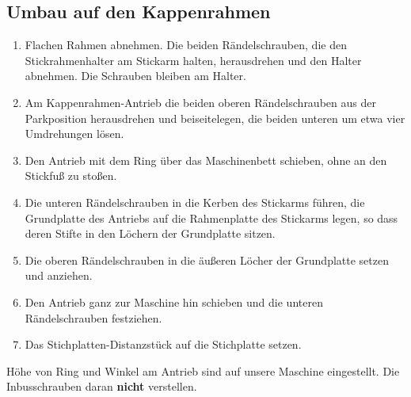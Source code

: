 \documentclass{\basedir/fablab-document}
\begin{document}
	\subsection{Umbau auf den Kappenrahmen}
	\begin{enumerate}
		\item Flachen Rahmen abnehmen. Die beiden Rändelschrauben, die den Stickrahmenhalter am Stickarm halten, herausdrehen und den Halter abnehmen. Die Schrauben bleiben am Halter.
		\item Am Kappenrahmen-Antrieb die beiden oberen Rändelschrauben aus der Parkposition herausdrehen und beiseitelegen, die beiden unteren um etwa vier Umdrehungen lösen.
		\item Den Antrieb mit dem Ring über das Maschinenbett schieben, ohne an den Stickfuß zu stoßen.
		\item Die unteren Rändelschrauben in die Kerben des Stickarms führen, die Grundplatte des Antriebs auf die Rahmenplatte des Stickarms legen, so dass deren Stifte in den Löchern der Grundplatte sitzen.
		\item Die oberen Rändelschrauben in die äußeren Löcher der Grundplatte setzen und anziehen.
		\item Den Antrieb ganz zur Maschine hin schieben und die unteren Rändelschrauben festziehen.
		\item Das Stichplatten-Distanzstück auf die Stichplatte setzen.
	\end{enumerate}
	Höhe von Ring und Winkel am Antrieb sind auf unsere Maschine eingestellt. Die Inbusschrauben daran \textbf{nicht} verstellen.
\end{document}

